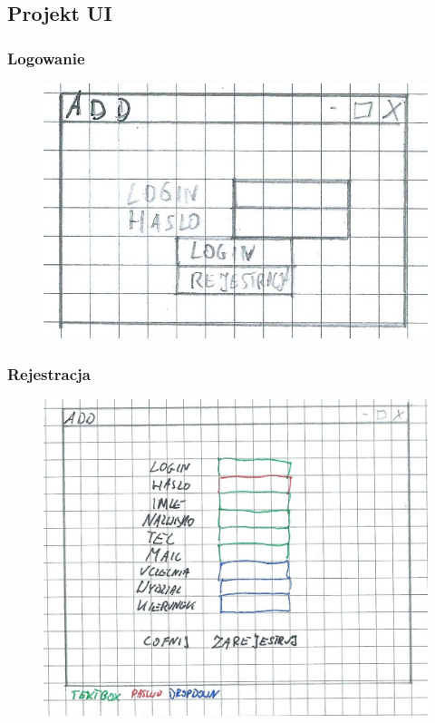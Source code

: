 \documentclass[12pt,a4paper]{article}
\begin{document}
		\subsection{Projekt UI}
			\subsubsection{Logowanie}
				\begin{figure}[H]
					\centering
					\includegraphics[]{login}
				\end{figure}
			\subsubsection{Rejestracja}
				\begin{figure}[H]
					\centering
					\includegraphics[]{rejestracja}
				\end{figure}
\end{document}
